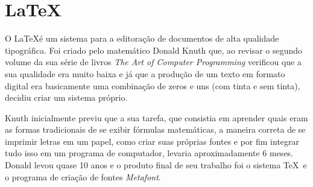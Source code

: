 \section{\LaTeX}
O \LaTeX é um sistema para a editoração de documentos de alta qualidade tipográfica. Foi criado pelo matemático Donald Knuth que, ao revisar o segundo volume da sua série de livros {\slshape The Art of Computer Programming} verificou que a sua qualidade era muito baixa e já que a produção de um texto em formato digital era basicamente uma combinação de zeros e uns (com tinta e sem tinta), decidiu criar um sistema próprio.

Knuth inicialmente previu que a sua tarefa, que consistia em aprender quais eram as formas tradicionais de se exibir fórmulas matemáticas, a maneira correta de se imprimir letras em um papel, como criar suas próprias fontes e por fim integrar tudo isso em um programa de computador, levaria aproximadamente 6 meses. Donald levou quase 10 anos e o produto final de seu trabalho foi o sistema \TeX \ e o programa de criação de fontes \textit{Metafont}.